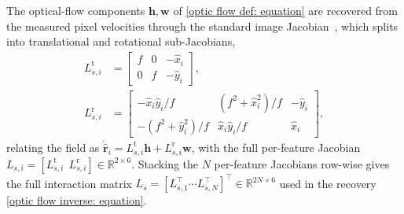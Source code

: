 \documentclass{IEEEtaes}
\theoremstyle{definition}
\theoremstyle{remark}
\begin{document}
The optical-flow components $\boldsymbol{h},\boldsymbol{w}$ of \eqref{optic flow def: equation} are recovered from the measured pixel velocities through the standard image Jacobian~\cite{chaumette2006}, which splits into translational and rotational sub-Jacobians,
\begin{align} \label{interaction matrix: equation}
L_{s,i}^\text{t} &= \begin{bmatrix} f & 0 & -\hat{x}_i \\ 0 & f & -\hat{y}_i \end{bmatrix},\nonumber\\
L_{s,i}^\text{r} &= \begin{bmatrix} -\hat{x}_i\hat{y}_i/f & (f^2+\hat{x}_i^2)/f & -\hat{y}_i \\ -(f^2+\hat{y}_i^2)/f & \hat{x}_i\hat{y}_i/f & \hat{x}_i \end{bmatrix},
\end{align}
relating the field as $\dot{\hat{\boldsymbol{r}}}_i = L_{s,i}^\text{t}\boldsymbol{h} + L_{s,i}^\text{r}\boldsymbol{w}$, with the full per-feature Jacobian $L_{s,i}=[L_{s,i}^\text{t}~~L_{s,i}^\text{r}]\in\mathbb{R}^{2\times 6}$. Stacking the $N$ per-feature Jacobians row-wise gives the full interaction matrix $L_s=[L_{s,1}^\top \cdots L_{s,N}^\top]^\top\in\mathbb{R}^{2N\times 6}$ used in the recovery \eqref{optic flow inverse: equation}.
\end{document}
